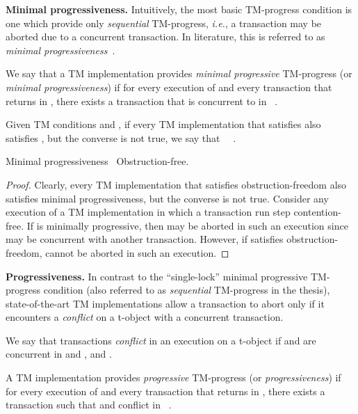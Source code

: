 \vspace{1mm}\noindent\textbf{Minimal progressiveness.}
Intuitively, the most basic TM-progress condition is one which provide only \emph{sequential} TM-progress, \emph{i.e.},
a transaction may be aborted due to a concurrent transaction.
In literature, this is referred to as \emph{minimal progressiveness}~\cite{tm-book}.
\begin{definition}
We say that a TM implementation  provides \emph{minimal progressive} TM-progress (or \emph{minimal progressiveness}) 
if for every execution  of 
and every transaction  that returns  in , there exists a transaction 
that is concurrent to  in ~\cite{tm-book}.
\end{definition}
Given TM conditions  and , if every TM implementation that satisfies 
 also satisfies , 
but the converse is not true, we say that ~~.
\begin{observation}
Minimal progressiveness~ Obstruction-free.
\end{observation}
\begin{proof}
Clearly, every TM implementation that satisfies obstruction-freedom also satisfies minimal progressiveness, but the converse 
is not true.
Consider any execution of a TM implementation  in which a transaction  run step contention-free.
If  is minimally progressive, then  may be aborted in such an execution since  may be concurrent with another transaction.
However, if  satisfies obstruction-freedom,  cannot be aborted in such an execution.
\end{proof}
\vspace{1mm}\noindent\textbf{Progressiveness.}
In contrast to the ``single-lock'' minimal progressive TM-progress
condition (also referred to as \emph{sequential} TM-progress in the thesis), 
state-of-the-art TM implementations
allow a transaction to abort only if it encounters a \emph{conflict} on a 
t-object with a concurrent transaction.
\begin{definition}[Conflicts]
We say that transactions  \emph{conflict} in an execution  on a t-object  if
 and  are concurrent in  and ,  and .
\end{definition}
\begin{definition}[Progressiveness]
\label{def:progdef}
A TM implementation  provides \emph{progressive} TM-progress (or \emph{progressiveness}) 
if for every execution  of  and every transaction  that returns  in ,
there exists a transaction  such that  and 
conflict in ~\cite{tm-book}. 
\end{definition}
